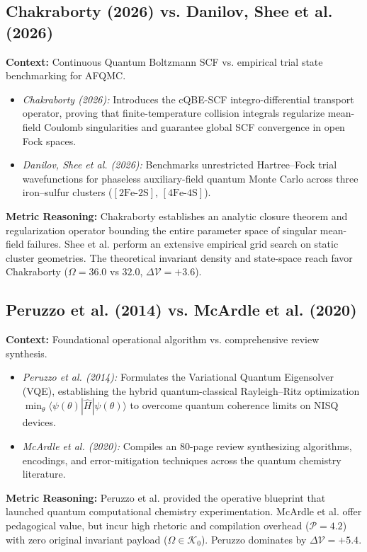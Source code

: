 \documentclass[twocolumn,10pt,letterpaper]{article}
\begin{document}
\subsection{Chakraborty (2026) vs. Danilov, Shee et al. (2026)}
\textbf{Context:} Continuous Quantum Boltzmann SCF vs. empirical trial state benchmarking for AFQMC.
\begin{itemize}
\item \textit{Chakraborty (2026):} Introduces the cQBE-SCF integro-differential transport operator, proving that finite-temperature collision integrals regularize mean-field Coulomb singularities and guarantee global SCF convergence in open Fock spaces.
\item \textit{Danilov, Shee et al. (2026):} Benchmarks unrestricted Hartree--Fock trial wavefunctions for phaseless auxiliary-field quantum Monte Carlo across three iron--sulfur clusters ($[2\mathrm{Fe}\text{-}2\mathrm{S}]$, $[4\mathrm{Fe}\text{-}4\mathrm{S}]$).
\end{itemize}
\textbf{Metric Reasoning:} Chakraborty establishes an analytic closure theorem and regularization operator bounding the entire parameter space of singular mean-field failures. Shee et al. perform an extensive empirical grid search on static cluster geometries. The theoretical invariant density and state-space reach favor Chakraborty ($\Omega = 36.0$ vs $32.0$, $\Delta \mathcal{V} = +3.6$).

\subsection{Peruzzo et al. (2014) vs. McArdle et al. (2020)}
\textbf{Context:} Foundational operational algorithm vs. comprehensive review synthesis.
\begin{itemize}
\item \textit{Peruzzo et al. (2014):} Formulates the Variational Quantum Eigensolver (VQE), establishing the hybrid quantum-classical Rayleigh--Ritz optimization $\min_\theta \langle \psi(\theta) | \hat{H} | \psi(\theta) \rangle$ to overcome quantum coherence limits on NISQ devices.
\item \textit{McArdle et al. (2020):} Compiles an 80-page review synthesizing algorithms, encodings, and error-mitigation techniques across the quantum chemistry literature.
\end{itemize}
\textbf{Metric Reasoning:} Peruzzo et al. provided the operative blueprint that launched quantum computational chemistry experimentation. McArdle et al. offer pedagogical value, but incur high rhetoric and compilation overhead ($\mathcal{P} = 4.2$) with zero original invariant payload ($\Omega \in \mathcal{K}_0$). Peruzzo dominates by $\Delta \mathcal{V} = +5.4$.
\end{document}
